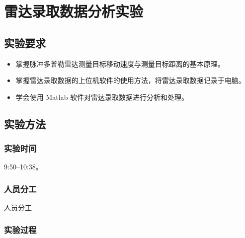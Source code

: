 \documentclass[../main]{subfiles}
\begin{document}
\chapter{雷达录取数据分析实验}%
\label{cha:analysis}

\section{实验要求}%
\label{sec:requirement}

\begin{itemize}
  \item 掌握脉冲多普勒雷达测量目标移动速度与测量目标距离的基本原理。
  \item 掌握雷达录取数据的上位机软件的使用方法，将雷达录取数据记录于电脑。
  \item 学会使用 Matlab 软件对雷达录取数据进行分析和处理。
\end{itemize}

\section{实验方法}%
\label{sec:\arabic{chapter}method}

\subsection{实验时间}%
\label{sub:\arabic{chapter}time}

9:50--10:38。

\subsection{人员分工}%
\label{sub:\arabic{chapter}people}

\begin{table}[htbp]
  \centering
  \caption{人员分工}%
  \label{tab:\arabic{chapter}people}
  \tiny
\end{table}

\subsection{实验过程}%
\label{sub:\arabic{chapter}process}
\end{document}

